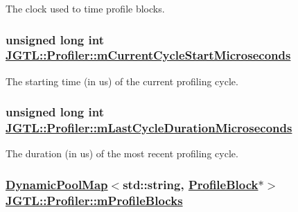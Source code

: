 The clock used to time profile blocks. 

\hypertarget{class_j_g_t_l_1_1_profiler_c68abd2b4577f814f6f42e1f7a91cc88}{
\subsubsection[mCurrentCycleStartMicroseconds]{\setlength{\rightskip}{0pt plus 5cm}unsigned long int \hyperlink{class_j_g_t_l_1_1_profiler_c68abd2b4577f814f6f42e1f7a91cc88}{JGTL::Profiler::m\-Current\-Cycle\-Start\-Microseconds}}}
\label{class_j_g_t_l_1_1_profiler_c68abd2b4577f814f6f42e1f7a91cc88}


The starting time (in us) of the current profiling cycle. 

\hypertarget{class_j_g_t_l_1_1_profiler_e6bcfdec9aa0d82a91c3c5b7f4338613}{
\subsubsection[mLastCycleDurationMicroseconds]{\setlength{\rightskip}{0pt plus 5cm}unsigned long int \hyperlink{class_j_g_t_l_1_1_profiler_e6bcfdec9aa0d82a91c3c5b7f4338613}{JGTL::Profiler::m\-Last\-Cycle\-Duration\-Microseconds}}}
\label{class_j_g_t_l_1_1_profiler_e6bcfdec9aa0d82a91c3c5b7f4338613}


The duration (in us) of the most recent profiling cycle. 

\hypertarget{class_j_g_t_l_1_1_profiler_7ac2afca08882c6e136cf31d614e1617}{
\subsubsection[mProfileBlocks]{\setlength{\rightskip}{0pt plus 5cm}\hyperlink{class_j_g_t_l_1_1_dynamic_pool_map}{Dynamic\-Pool\-Map}$<$std::string, \hyperlink{struct_j_g_t_l_1_1_profile_block}{Profile\-Block}$\ast$$>$ \hyperlink{class_j_g_t_l_1_1_profiler_7ac2afca08882c6e136cf31d614e1617}{JGTL::Profiler::m\-Profile\-Blocks}}}
\label{class_j_g_t_l_1_1_profiler_7ac2afca08882c6e136cf31d614e1617}


